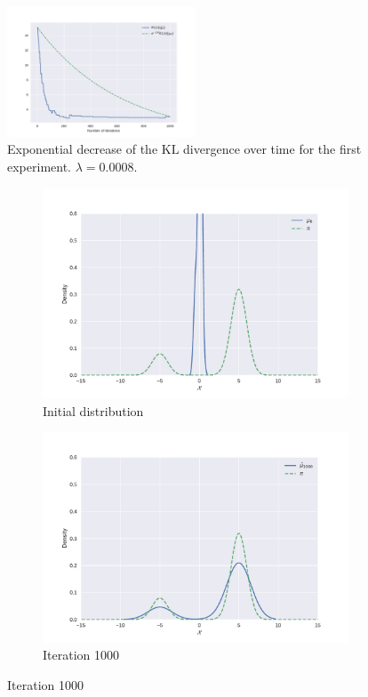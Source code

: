 \documentclass{article}
\newcommand{\KL}{\mathrm{KL}}
\begin{document}
\begin{figure}[H]
  \centering
  \includegraphics[width=0.5\textwidth]{exp1-KL.pdf}
  \caption{Exponential decrease of the $\KL$ divergence
    over time for the first experiment. $\lambda=0.0008$.}
  \label{fig:KL-exp1}
\end{figure}

\begin{figure}[H]
  \centering
  \begin{subfigure}{0.48\textwidth}
    \centering
    \includegraphics[width=\textwidth]{exp2-0.pdf}
    \caption{Initial distribution}
  \end{subfigure}
  \begin{subfigure}{0.48\textwidth}
    \centering
    \includegraphics[width=\textwidth]{exp2-1000.pdf}
    \caption{Iteration 1000}
  \end{subfigure}


\end{figure}
\end{document}
